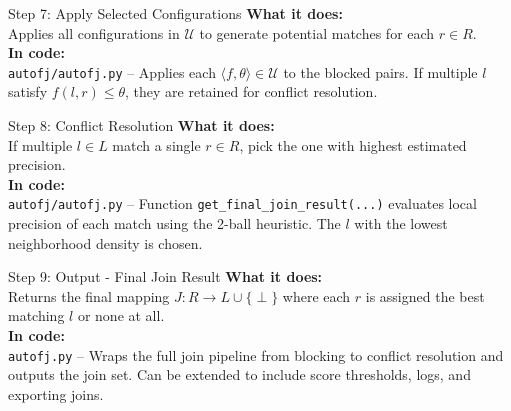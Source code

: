 \documentclass[8pt]{beamer} %
\begin{document}
\begin{frame}{Step 7: Apply Selected Configurations}
	\textbf{What it does:} \\
	Applies all configurations in $\mathcal{U}$ to generate potential matches for each $r \in R$. \\[1ex]
	\textbf{In code:} \\
	\texttt{autofj/autofj.py} – Applies each $\langle f, \theta \rangle \in \mathcal{U}$ to the blocked pairs. If multiple $l$ satisfy $f(l, r) \leq \theta$, they are retained for conflict resolution.
\end{frame}

\begin{frame}{Step 8: Conflict Resolution}
	\textbf{What it does:} \\
	If multiple $l \in L$ match a single $r \in R$, pick the one with highest estimated precision. \\[1ex]
	\textbf{In code:} \\
	\texttt{autofj/autofj.py} – Function \texttt{get\_final\_join\_result(...)} evaluates local precision of each match using the 2-ball heuristic. The $l$ with the lowest neighborhood density is chosen.
\end{frame}

\begin{frame}{Step 9: Output - Final Join Result}
	\textbf{What it does:} \\
	Returns the final mapping $J: R \rightarrow L \cup \{\perp\}$ where each $r$ is assigned the best matching $l$ or none at all. \\[1ex]
	\textbf{In code:} \\
	\texttt{autofj.py} – Wraps the full join pipeline from blocking to conflict resolution and outputs the join set. Can be extended to include score thresholds, logs, and exporting joins.
\end{frame}
\end{document}
